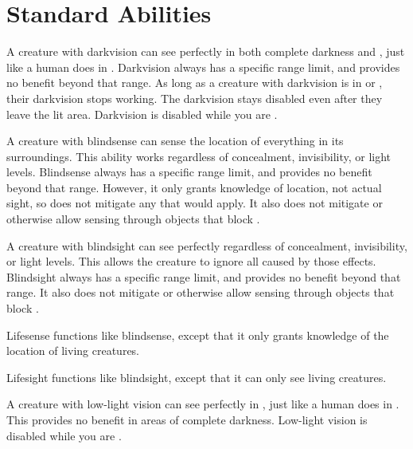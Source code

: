 \section{Standard Abilities}


        A creature with darkvision can see perfectly in both complete darkness and , just like a human does in .
        Darkvision always has a specific range limit, and provides no benefit beyond that range.
        As long as a creature with darkvision is in  or , their darkvision stops working.
        The darkvision  stays disabled even after they leave the lit area.
        Darkvision is disabled while you are \dazzled.

        A creature with blindsense can sense the location of everything in its surroundings.
        This ability works regardless of concealment, invisibility, or light levels.
        Blindsense always has a specific range limit, and provides no benefit beyond that range.
        However, it only grants knowledge of location, not actual sight, so does not mitigate any  that would apply.
        It also does not mitigate  or otherwise allow sensing through objects that block .

        A creature with blindsight can see perfectly regardless of concealment, invisibility, or light levels.
        This allows the creature to ignore all  caused by those effects.
        Blindsight always has a specific range limit, and provides no benefit beyond that range.
        It also does not mitigate  or otherwise allow sensing through objects that block .

        Lifesense functions like blindsense, except that it only grants knowledge of the location of living creatures.

        Lifesight functions like blindsight, except that it can only see living creatures.

        A creature with low-light vision can see perfectly in , just like a human does in .
        This provides no benefit in areas of complete darkness.
        Low-light vision is disabled while you are \dazzled.

